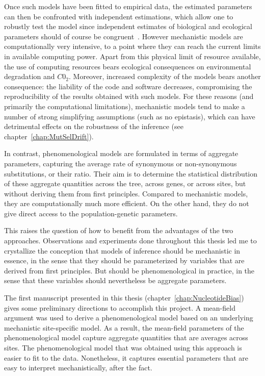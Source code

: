 Once such models have been fitted to empirical data, the estimated parameters can then be confronted with independent estimations, which allow one to robustly test the model since independent estimates of biological and ecological parameters should of course be congruent~\citep{Dasmeh2014}.
However mechanistic models are computationally very intensive, to a point where they can reach the current limits in available computing power.
Apart from this physical limit of resource available, the use of computing resources bears ecological consequences on environmental degradation and $C0_2$.
Moreover, increased complexity of the models bears another consequence: the liability of the code and software decreases, compromising the reproducibility of the results obtained with such models.
For these reasons (and primarily the computational limitations), mechanistic models tend to make a number of strong simplifying assumptions (such as no epistasis), which can have detrimental effects on the robustness of the inference (see chapter~\ref{chap:MutSelDrift}).

In contrast, phenomenological models are formulated in terms of aggregate parameters, capturing the average rate of synonymous or non-synonymous substitutions, or their ratio.
Their aim is to determine the statistical distribution of these aggregate quantities across the tree, across genes, or across sites, but without deriving them from first principles.
Compared to mechanistic models, they are computationally much more efficient.
On the other hand, they do not give direct access to the population-genetic parameters.

This raises the question of how to benefit from the advantages of the two approaches.
Observations and experiments done throughout this thesis led me to crystallize the conception that models of inference should be mechanistic in essence, in the sense that they should be parameterized by variables that are derived from first principles.
But should be phenomenological in practice, in the sense that these variables should nevertheless be aggregate parameters.

The first manuscript presented in this thesis (chapter~\ref{chap:NucleotideBias}) gives some preliminary directions to accomplish this project.
A mean-field argument was used to derive a phenomenological model based on an underlying mechanistic site-specific model.
As a result, the mean-field parameters of the phenomenological model capture aggregate quantities that are averages across sites.
The phenomenological model that was obtained using this approach is easier to fit to the data.
Nonetheless, it captures essential parameters that are easy to interpret mechanistically, after the fact.

